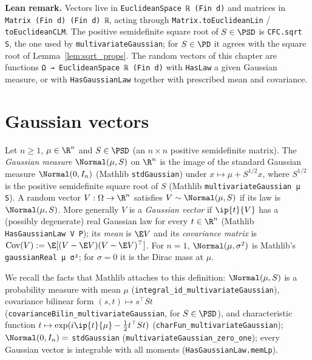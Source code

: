 \textbf{Lean remark.} Vectors live in \texttt{EuclideanSpace ℝ (Fin d)} and matrices in
\texttt{Matrix (Fin d) (Fin d) ℝ}, acting through \texttt{Matrix.toEuclideanLin} /
\texttt{toEuclideanCLM}. The positive semidefinite square root of $S \in \PSD$ is
\texttt{CFC.sqrt S}, the one used by \texttt{multivariateGaussian}; for $S \in \PD$ it agrees
with the square root of Lemma~\ref{lem:sqrt_props}. The random vectors of this chapter are
functions \texttt{Ω → EuclideanSpace ℝ (Fin d)} with \texttt{HasLaw} a given Gaussian measure,
or with \texttt{HasGaussianLaw} together with prescribed mean and covariance.

\section{Gaussian vectors}
\label{sec:pre_gaussian_vectors}

\begin{definition}\label{def:pg_gaussian_vector}
Let $n \ge 1$, $\mu \in \R^n$ and $S \in \PSD$ (an $n \times n$ positive semidefinite
matrix). The \emph{Gaussian measure} $\Normal(\mu, S)$ on $\R^n$ is the image of the standard
Gaussian measure $\Normal(0, I_n)$ (Mathlib \texttt{stdGaussian}) under
$x \mapsto \mu + S^{1/2}x$, where $S^{1/2}$ is the positive semidefinite square root of $S$
(Mathlib \texttt{multivariateGaussian μ S}). A random vector $V : \Omega \to \R^n$ satisfies
$V \sim \Normal(\mu, S)$ if its law is $\Normal(\mu,S)$. More generally $V$ is a
\emph{Gaussian vector} if $\ip{t}{V}$ has a (possibly degenerate) real Gaussian law for every
$t \in \R^n$ (Mathlib \texttt{HasGaussianLaw V P}); its \emph{mean} is $\E V$ and its
\emph{covariance matrix} is $\operatorname{Cov}(V) := \E[(V - \E V)(V - \E V)^\top]$.
For $n = 1$, $\Normal(\mu, \sigma^2)$ is Mathlib's \texttt{gaussianReal μ σ²}; for
$\sigma = 0$ it is the Dirac mass at $\mu$.
\end{definition}

We recall the facts that Mathlib attaches to this definition: $\Normal(\mu,S)$ is a
probability measure with mean $\mu$ (\texttt{integral\_id\_multivariateGaussian}), covariance
bilinear form $(s,t) \mapsto s^\top S t$ (\texttt{covarianceBilin\_multivariateGaussian}, for
$S \in \PSD$), and characteristic function
$t \mapsto \exp(i\ip{t}{\mu} - \tfrac12 t^\top S t)$ (\texttt{charFun\_multivariateGaussian});
$\Normal(0, I_n) = $ \texttt{stdGaussian} (\texttt{multivariateGaussian\_zero\_one}); every
Gaussian vector is integrable with all moments (\texttt{HasGaussianLaw.memLp}).


